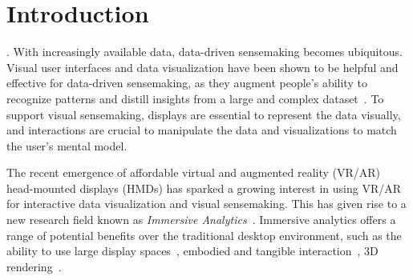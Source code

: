 \section{Introduction}
\label{sec:intro}

 .
With increasingly available data, data-driven sensemaking becomes ubiquitous.
Visual user interfaces and data visualization have been shown to be helpful and effective for data-driven sensemaking,
as they augment people's ability to recognize patterns and distill insights from a large and complex dataset~\cite{card1999readings,andrews2010space,endert2012semantic}.
To support visual sensemaking, displays are essential to represent the data visually, and interactions are crucial to manipulate the data and visualizations to match the user's mental model.

The recent emergence of affordable virtual and augmented reality (VR/AR) head-mounted displays (HMDs) has sparked a growing interest in using VR/AR for interactive data visualization and visual sensemaking.
This has given rise to a new research field known as \textit{Immersive Analytics}~\cite{ens2021grand,marriott2018immersive}.
Immersive analytics offers a range of potential benefits over the traditional desktop environment, such as the ability to use large display spaces~\cite{satriadi2020maps,lisle2020evaluating,yang2020embodied}, embodied and tangible interaction~\cite{yang2020tilt,cordeil2017imaxes,tong2022exploring,in2023table,hurter2018fiberclay}, 3D rendering~\cite{bach2017hologram,yang2018maps,kraus2019impact,kwon2016study,brath20143d}.

